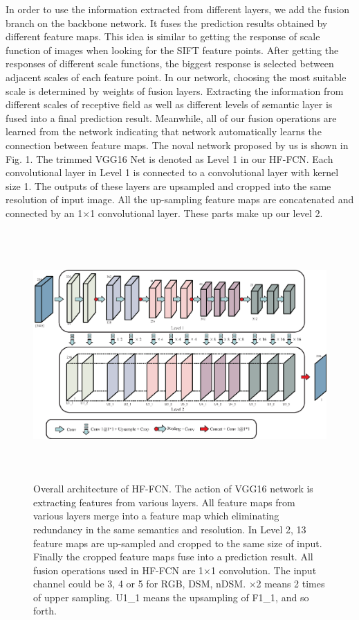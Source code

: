 \setlength{\parindent}{2ex}In order to use the information extracted from different layers, we add the fusion branch on the backbone network. It fuses the prediction results obtained by different feature maps. This idea is similar to getting the response of scale function of images when looking for the SIFT feature points. After getting the responses of different scale functions, the biggest response is selected between adjacent scales of each feature point. In our network, choosing the most suitable scale is determined by weights of fusion layers. Extracting the information from different scales of receptive field as well as different levels of semantic layer is fused into a final prediction result. Meanwhile, all of our fusion operations are learned from the network indicating that network automatically learns the connection between feature maps. The noval network proposed by us is shown in Fig. 1. The trimmed VGG16 Net is denoted as Level 1 in our HF-FCN. Each convolutional layer in Level 1 is connected to a convolutional layer with kernel size 1. The outputs of these layers are upsampled and cropped into the same resolution of input image. All the up-sampling feature maps are concatenated and connected  by an 1$\times$1 convolutional layer. These parts make up our level 2.\par
\begin{figure}
\centering
\includegraphics[width=18cm,height=9.5cm]{Figures/network_architecture.eps}
\centering
\caption{Overall architecture of HF-FCN. The action of VGG16 network is extracting features from various layers. All feature maps from various layers merge into a feature map which eliminating redundancy in the same semantics and resolution. In Level 2, 13 feature maps are up-sampled and cropped to the same size of input. Finally the cropped feature maps fuse into a prediction result. All fusion operations used in HF-FCN are 1$\times$1 convolution. The input channel could be 3, 4 or 5 for RGB, DSM, nDSM. $\times$2 means 2 times of upper sampling. U1\_1 means the upsampling of F1\_1, and so forth.  }
\label{3}
\end{figure}
